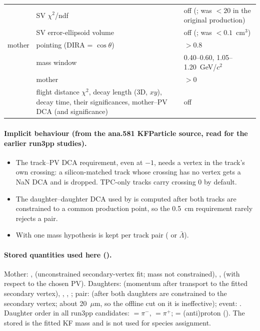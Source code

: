 \begin{table}[H]
\begin{tabular}{L{2.2cm}L{5.4cm}L{7.6cm}}
 & SV $\chi^2$/ndf & off (; was $<20$ in the original production) \\
 & SV error-ellipsoid volume & off (; was $<0.1$~cm$^3$) \\
\midrule
mother & pointing (DIRA = $\cos\theta$) & $>0.8$ \\
 & mass window & \Ks{} 0.40--0.60, \La{} 1.05--1.20~GeV/$c^2$ \\
 & mother \pt{} & $>0$ \\
 & flight distance $\chi^2$, decay length (3D, $xy$), decay time, their significances, mother--PV DCA (and significance) & off \\
\bottomrule
\end{tabular}
\end{table}

\paragraph{Implicit behaviour (from the ana.581 KFParticle source, read for the earlier run3pp studies).}
\begin{itemize}
\item The track--PV DCA requirement, even at $-1$, needs a vertex in the track's own crossing: a silicon-matched track whose
  crossing has no vertex gets a NaN DCA and is dropped. TPC-only tracks carry crossing 0 by default.
\item The daughter--daughter DCA used by  is computed after both tracks are constrained to a common
  production point, so the 0.5~cm requirement rarely rejects a pair.
\item With  one mass hypothesis is kept per track pair (\La{} or $\bar\Lambda$).
\end{itemize}

\paragraph{Stored quantities used here ().} Mother: ,  (unconstrained
secondary-vertex fit; mass not constrained), ,  (with respect to the chosen PV).
Daughters:  (momentum after transport to the fitted secondary vertex), ,
, ; pair:  (after both daughters are
constrained to the secondary vertex; about 20~$\mu$m, so the offline cut on it is ineffective); event:
. Daughter order in all run3pp candidates: \Ks{}  $=\pi^-$,  $=\pi^+$;
\La{}  = (anti)proton (). The stored  is the fitted KF
mass and is not used for species assignment.

